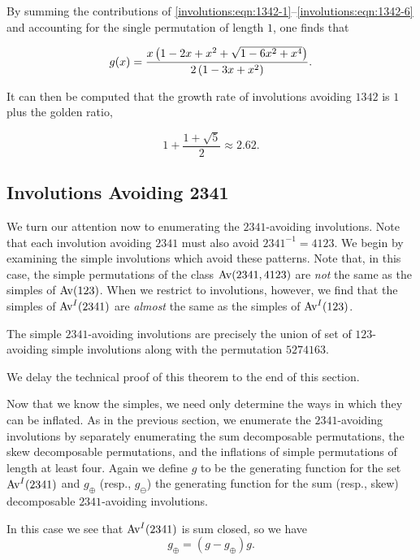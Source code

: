     By summing the contributions of 
    \eqref{involutions:eqn:1342-1}--\eqref{involutions:eqn:1342-6} 
    and accounting for the single permutation of length $1$, one finds that
    
    $$ g(x) = \frac{x\left({1-2x+x^2+\sqrt{1-6x^2+x^4}}\right)}{2\left({1-3x+x^2}\right)}.$$

    It can then be computed that the growth rate of involutions avoiding $1342$
    is $1$ plus the golden ratio, 
    
    $$ 1+\frac{1+\sqrt{5}}{2} \approx 2.62. $$


  \subsection{Involutions Avoiding 2341}
  \label{involutions:sub:2341}

    We turn our attention now to enumerating the $2341$-avoiding involutions.
    Note that each involution avoiding $2341$ must also avoid $2341^{-1} =
    4123$. We begin by examining the simple involutions which avoid these
    patterns. Note that, in this case, the simple permutations of the class
    $\operatorname{{Av}}(2341, 4123)$ are \emph{not} the same as the simples of $\operatorname{{Av}}(123)$.
    When we restrict to involutions, however, we find that the simples of
    $\operatorname{{Av}}^I(2341)$ are \emph{almost} the same as the simples of $\operatorname{{Av}}^I(123)$. 

    \begin{theorem}\label{involutions:thm:2341simples}
      The simple $2341$-avoiding involutions are precisely the union of set of
      $123$-avoiding simple involutions along with the permutation $5274163$. 
    \end{theorem}

    We delay the technical proof of this theorem to the end of this section. 

    Now that we know the simples, we need only determine the ways in which they
    can be inflated. 
    As in the previous section, we enumerate the $2341$-avoiding involutions by
    separately enumerating the sum decomposable permutations, the skew decomposable
    permutations, and the inflations of simple permutations of length at least
    four. Again we define $g$ to be the generating function for the set
    $\operatorname{{Av}}^I(2341)$ and $g_\oplus$ (resp., $g_\ominus$) the generating function for
    the sum (resp., skew) decomposable $2341$-avoiding involutions.

    In this case we see that $\operatorname{{Av}}^I(2341)$ is sum closed, so we have
    $$ g_\oplus = (g - g_\oplus)g. $$

